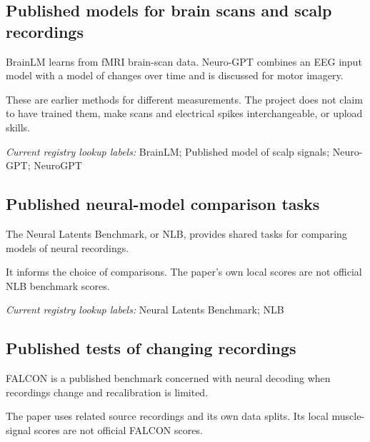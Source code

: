 \begin{samepage}
\subsection*{Published models for brain scans and scalp recordings}
\noindent BrainLM learns from fMRI brain-scan data. Neuro-GPT combines an EEG input model with a model of changes over time and is discussed for motor imagery.\par
\end{samepage}
\begin{samepage}
\noindent These are earlier methods for different measurements. The project does not claim to have trained them, make scans and electrical spikes interchangeable, or upload skills.\par\nopagebreak[4]

\end{samepage}


\noindent\textit{Current registry lookup labels:} BrainLM; Published model of scalp signals; Neuro-GPT; NeuroGPT\par

\begin{samepage}
\subsection*{Published neural-model comparison tasks}
\noindent The Neural Latents Benchmark, or NLB, provides shared tasks for comparing models of neural recordings.\par
\end{samepage}
\begin{samepage}
\noindent It informs the choice of comparisons. The paper’s own local scores are not official NLB benchmark scores.\par\nopagebreak[4]

\end{samepage}


\noindent\textit{Current registry lookup labels:} Neural Latents Benchmark; NLB\par

\begin{samepage}
\subsection*{Published tests of changing recordings}
\noindent FALCON is a published benchmark concerned with neural decoding when recordings change and recalibration is limited.\par
\end{samepage}
\begin{samepage}
\noindent The paper uses related source recordings and its own data splits. Its local muscle-signal scores are not official FALCON scores.\par\nopagebreak[4]

\end{samepage}


